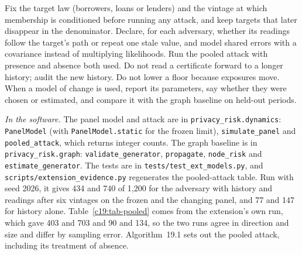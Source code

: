 \begin{inpractice}
Fix the target law (borrowers, loans or lenders) and the vintage at which membership is
conditioned before running any attack, and keep targets that later disappear in the denominator.
Declare, for each adversary, whether its readings follow the target's path or repeat one stale
value, and model shared errors with a covariance instead of multiplying likelihoods. Run the
pooled attack with presence and absence both used. Do not read a certificate forward to a longer
history; audit the new history. Do not lower a floor because exposures move. When a model of
change is used, report its parameters, say whether they were chosen or estimated, and compare
it with the graph baseline on held-out periods.

\medskip\noindent\textit{In the software.} The panel model and attack are in \texttt{privacy\_risk.dynamics}: \texttt{PanelModel}
(with \texttt{PanelModel.static} for the frozen limit), \texttt{simulate\_panel} and \texttt{pooled\_attack},
which returns integer counts. The graph baseline is in \texttt{privacy\_risk.graph}:
\texttt{validate\_generator}, \texttt{propagate}, \texttt{node\_risk} and \texttt{estimate\_generator}. The tests are in \texttt{tests/test\_ext\_models.py}, and \texttt{scripts/extension\_evidence.py} regenerates the pooled-attack table. Run with seed 2026, it gives 434 and 740 of 1,200 for the adversary with history and readings after six vintages on the frozen and the changing panel, and 77 and 147 for history alone. Table~\ref{c19:tab-pooled} comes from the extension's own run, which gave 403 and 703 and 90 and 134, so the two runs agree in direction and size and differ by sampling error.
Algorithm~19.1 sets out the pooled attack, including its treatment of absence.
\end{inpractice}

